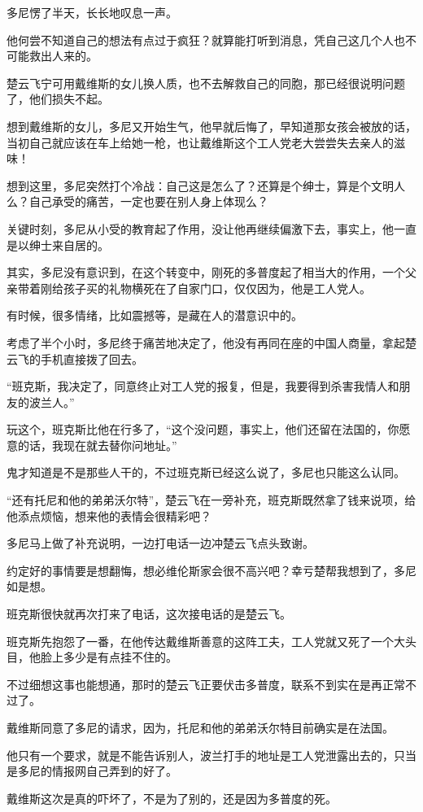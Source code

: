 多尼愣了半天，长长地叹息一声。

他何尝不知道自己的想法有点过于疯狂？就算能打听到消息，凭自己这几个人也不可能救出人来的。

楚云飞宁可用戴维斯的女儿换人质，也不去解救自己的同胞，那已经很说明问题了，他们损失不起。

想到戴维斯的女儿，多尼又开始生气，他早就后悔了，早知道那女孩会被放的话，当初自己就应该在车上给她一枪，也让戴维斯这个工人党老大尝尝失去亲人的滋味！

想到这里，多尼突然打个冷战：自己这是怎么了？还算是个绅士，算是个文明人么？自己承受的痛苦，一定也要在别人身上体现么？

关键时刻，多尼从小受的教育起了作用，没让他再继续偏激下去，事实上，他一直是以绅士来自居的。

其实，多尼没有意识到，在这个转变中，刚死的多普度起了相当大的作用，一个父亲带着刚给孩子买的礼物横死在了自家门口，仅仅因为，他是工人党人。

有时候，很多情绪，比如震撼等，是藏在人的潜意识中的。

考虑了半个小时，多尼终于痛苦地决定了，他没有再同在座的中国人商量，拿起楚云飞的手机直接拨了回去。

“班克斯，我决定了，同意终止对工人党的报复，但是，我要得到杀害我情人和朋友的波兰人。”

玩这个，班克斯比他在行多了，“这个没问题，事实上，他们还留在法国的，你愿意的话，我现在就去替你问地址。”

鬼才知道是不是那些人干的，不过班克斯已经这么说了，多尼也只能这么认同。

“还有托尼和他的弟弟沃尔特”，楚云飞在一旁补充，班克斯既然拿了钱来说项，给他添点烦恼，想来他的表情会很精彩吧？

多尼马上做了补充说明，一边打电话一边冲楚云飞点头致谢。

约定好的事情要是想翻悔，想必维伦斯家会很不高兴吧？幸亏楚帮我想到了，多尼如是想。

班克斯很快就再次打来了电话，这次接电话的是楚云飞。

班克斯先抱怨了一番，在他传达戴维斯善意的这阵工夫，工人党就又死了一个大头目，他脸上多少是有点挂不住的。

不过细想这事也能想通，那时的楚云飞正要伏击多普度，联系不到实在是再正常不过了。

戴维斯同意了多尼的请求，因为，托尼和他的弟弟沃尔特目前确实是在法国。

他只有一个要求，就是不能告诉别人，波兰打手的地址是工人党泄露出去的，只当是多尼的情报网自己弄到的好了。

戴维斯这次是真的吓坏了，不是为了别的，还是因为多普度的死。

